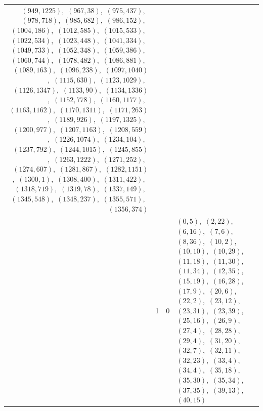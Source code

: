 \documentclass[11pt]{article}
\begin{document}
\begin{longtable}{@{}rrl>{\raggedright\arraybackslash}p{}@{}}
$(949,1225)$,\allowbreak\ $(967,38)$,\allowbreak\ $(975,437)$,\allowbreak\ $(978,718)$,\allowbreak\ $(985,682)$,\allowbreak\ $(986,152)$,\allowbreak\ $(1004,186)$,\allowbreak\ $(1012,585)$,\allowbreak\ $(1015,533)$,\allowbreak\ $(1022,534)$,\allowbreak\ $(1023,448)$,\allowbreak\ $(1041,334)$,\allowbreak\ $(1049,733)$,\allowbreak\ $(1052,348)$,\allowbreak\ $(1059,386)$,\allowbreak\ $(1060,744)$,\allowbreak\ $(1078,482)$,\allowbreak\ $(1086,881)$,\allowbreak\ $(1089,163)$,\allowbreak\ $(1096,238)$,\allowbreak\ $(1097,1040)$,\allowbreak\ $(1115,630)$,\allowbreak\ $(1123,1029)$,\allowbreak\ $(1126,1347)$,\allowbreak\ $(1133,90)$,\allowbreak\ $(1134,1336)$,\allowbreak\ $(1152,778)$,\allowbreak\ $(1160,1177)$,\allowbreak\ $(1163,1162)$,\allowbreak\ $(1170,1311)$,\allowbreak\ $(1171,263)$,\allowbreak\ $(1189,926)$,\allowbreak\ $(1197,1325)$,\allowbreak\ $(1200,977)$,\allowbreak\ $(1207,1163)$,\allowbreak\ $(1208,559)$,\allowbreak\ $(1226,1074)$,\allowbreak\ $(1234,104)$,\allowbreak\ $(1237,792)$,\allowbreak\ $(1244,1015)$,\allowbreak\ $(1245,855)$,\allowbreak\ $(1263,1222)$,\allowbreak\ $(1271,252)$,\allowbreak\ $(1274,607)$,\allowbreak\ $(1281,867)$,\allowbreak\ $(1282,1151)$,\allowbreak\ $(1300,1)$,\allowbreak\ $(1308,400)$,\allowbreak\ $(1311,422)$,\allowbreak\ $(1318,719)$,\allowbreak\ $(1319,78)$,\allowbreak\ $(1337,149)$,\allowbreak\ $(1345,548)$,\allowbreak\ $(1348,237)$,\allowbreak\ $(1355,571)$,\allowbreak\ $(1356,374)$\\
\addlinespace[3pt]
41 & 1 & $0$ & $(0,5)$,\allowbreak\ $(2,22)$,\allowbreak\ $(6,16)$,\allowbreak\ $(7,6)$,\allowbreak\ $(8,36)$,\allowbreak\ $(10,2)$,\allowbreak\ $(10,10)$,\allowbreak\ $(10,29)$,\allowbreak\ $(11,18)$,\allowbreak\ $(11,30)$,\allowbreak\ $(11,34)$,\allowbreak\ $(12,35)$,\allowbreak\ $(15,19)$,\allowbreak\ $(16,28)$,\allowbreak\ $(17,9)$,\allowbreak\ $(20,6)$,\allowbreak\ $(22,2)$,\allowbreak\ $(23,12)$,\allowbreak\ $(23,31)$,\allowbreak\ $(23,39)$,\allowbreak\ $(25,16)$,\allowbreak\ $(26,9)$,\allowbreak\ $(27,4)$,\allowbreak\ $(28,28)$,\allowbreak\ $(29,4)$,\allowbreak\ $(31,20)$,\allowbreak\ $(32,7)$,\allowbreak\ $(32,11)$,\allowbreak\ $(32,23)$,\allowbreak\ $(33,4)$,\allowbreak\ $(34,4)$,\allowbreak\ $(35,18)$,\allowbreak\ $(35,30)$,\allowbreak\ $(35,34)$,\allowbreak\ $(37,35)$,\allowbreak\ $(39,13)$,\allowbreak\ $(40,15)$\\

\end{longtable}
\end{document}
